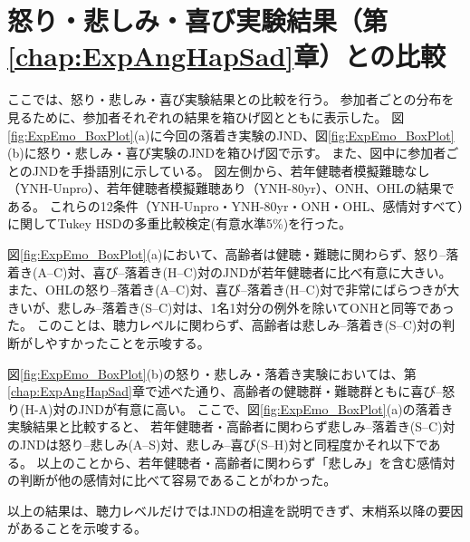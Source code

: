 





\clearpage
\section{怒り・悲しみ・喜び実験結果（第\ref{chap:ExpAngHapSad}章）との比較}
ここでは、怒り・悲しみ・喜び実験結果との比較を行う。
参加者ごとの分布を見るために、参加者それぞれの結果を箱ひげ図とともに表示した。
図\ref{fig:ExpEmo_BoxPlot}(a)に今回の落着き実験のJND、図\ref{fig:ExpEmo_BoxPlot}(b)に怒り・悲しみ・喜び実験のJNDを箱ひげ図で示す。
また、図中に参加者ごとのJNDを手掛語別に示している。
図左側から、若年健聴者模擬難聴なし（YNH-Unpro）、若年健聴者模擬難聴あり（YNH-80yr）、ONH、OHLの結果である。
これらの12条件（YNH-Unpro・YNH-80yr・ONH・OHL、感情対すべて）に関してTukey HSDの多重比較検定(有意水準5\%)を行った。

図\ref{fig:ExpEmo_BoxPlot}(a)において、高齢者は健聴・難聴に関わらず、怒り--落着き(A--C)対、喜び--落着き(H--C)対のJNDが若年健聴者に比べ有意に大きい。
また、OHLの怒り--落着き(A--C)対、喜び--落着き(H--C)対で非常にばらつきが大きいが、悲しみ--落着き(S--C)対は、1名1対分の例外を除いてONHと同等であった。
このことは、聴力レベルに関わらず、高齢者は悲しみ--落着き(S--C)対の判断がしやすかったことを示唆する。

図\ref{fig:ExpEmo_BoxPlot}(b)の怒り・悲しみ・落着き実験においては、第\ref{chap:ExpAngHapSad}章で述べた通り、高齢者の健聴群・難聴群ともに喜び--怒り(H-A)対のJNDが有意に高い。
ここで、図\ref{fig:ExpEmo_BoxPlot}(a)の落着き実験結果と比較すると、
若年健聴者・高齢者に関わらず悲しみ--落着き(S--C)対のJNDは怒り--悲しみ(A--S)対、悲しみ--喜び(S--H)対と同程度かそれ以下である。
以上のことから、若年健聴者・高齢者に関わらず「悲しみ」を含む感情対の判断が他の感情対に比べて容易であることがわかった。

以上の結果は、聴力レベルだけではJNDの相違を説明できず、末梢系以降の要因があることを示唆する。



\newpage
